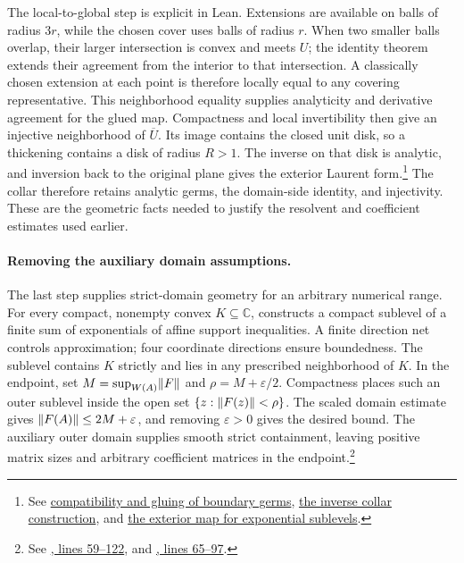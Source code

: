 The local-to-global step is explicit in Lean. Extensions are available
on balls of radius $3r$, while the chosen cover uses balls of radius $r$.
When two smaller balls overlap, their larger intersection is convex and
meets $U$; the identity theorem extends their agreement from the interior
to that intersection. A classically chosen extension at each point is
therefore locally equal to any covering representative. This neighborhood
equality supplies analyticity and derivative agreement for the glued map.
Compactness and local invertibility then give an injective neighborhood
of $\overline U$. Its image contains the closed unit disk, so a thickening
contains a disk of radius $R>1$. The inverse on that disk is analytic,
and inversion back to the original plane gives the exterior Laurent
form.\footnote{See
\href{https://github.com/openai/math/blob/fd4aeeb2ee4fc729c18d98444fed42fd0529eeeb/lean/OAI/Analysis/DirectCrouzeix/Continuation.lean\#L31-L111}{compatibility and gluing of boundary germs},
\href{https://github.com/openai/math/blob/fd4aeeb2ee4fc729c18d98444fed42fd0529eeeb/lean/OAI/Analysis/DirectCrouzeix/ConformalCollar.lean\#L129-L238}{the inverse collar construction}, and
\href{https://github.com/openai/math/blob/fd4aeeb2ee4fc729c18d98444fed42fd0529eeeb/lean/OAI/Analysis/DirectCrouzeix/ExteriorMapping.lean\#L148-L214}{the exterior map for exponential sublevels}.}
The collar therefore retains analytic germs, the domain-side identity, and injectivity. These are the geometric facts needed to justify the resolvent and coefficient estimates used earlier.

\paragraph{Removing the auxiliary domain assumptions.}
The last step supplies strict-domain geometry for an arbitrary numerical range. For every compact,
nonempty convex $K\subseteq\mathbb C$, 
constructs a compact sublevel of a finite sum of exponentials of affine
support inequalities. A finite direction net controls approximation;
four coordinate directions ensure boundedness. The sublevel contains $K$
strictly and lies in any prescribed neighborhood of $K$.
In the endpoint, set
$M=\sup_{W(A)}\lVert F\rVert$ and $\rho=M+\varepsilon/2$.
Compactness places such an outer sublevel inside the open set
$\{z:\lVert F(z)\rVert<\rho\}$. The scaled domain estimate gives
$\lVert F(A)\rVert\leq2M+\varepsilon$, and removing $\varepsilon>0$ gives the
desired bound. The auxiliary outer domain supplies smooth strict containment, leaving positive matrix sizes and arbitrary coefficient matrices in the endpoint.\footnote{See
\href{https://github.com/openai/math/blob/fd4aeeb2ee4fc729c18d98444fed42fd0529eeeb/lean/OAI/Analysis/DirectCrouzeix/OuterApproximation.lean\#L59-L122}{, lines 59--122}, and
\href{https://github.com/openai/math/blob/fd4aeeb2ee4fc729c18d98444fed42fd0529eeeb/lean/OAI/Analysis/DirectCrouzeix/CompleteBound.lean\#L65-L97}{, lines 65--97}.}

